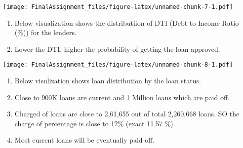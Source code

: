 \documentclass[]{article}
\newenvironment{Shaded}{\begin{snugshade}}{\end{snugshade}}
\newcommand{\DataTypeTok}[1]{\textcolor[rgb]{0.13,0.29,0.53}{#1}}
\newcommand{\DecValTok}[1]{\textcolor[rgb]{0.00,0.00,0.81}{#1}}
\newcommand{\FloatTok}[1]{\textcolor[rgb]{0.00,0.00,0.81}{#1}}
\newcommand{\KeywordTok}[1]{\textcolor[rgb]{0.13,0.29,0.53}{\textbf{#1}}}
\newcommand{\NormalTok}[1]{#1}
\newcommand{\OperatorTok}[1]{\textcolor[rgb]{0.81,0.36,0.00}{\textbf{#1}}}
\newcommand{\StringTok}[1]{\textcolor[rgb]{0.31,0.60,0.02}{#1}}
\providecommand{\tightlist}{%
  \setlength{\itemsep}{0pt}\setlength{\parskip}{0pt}}
\begin{document}
\texttt{[image: FinalAssignment\_files/figure-latex/unnamed-chunk-7-1.pdf]}

\begin{enumerate}
\def\labelenumi{\arabic{enumi}.}
\tightlist
\item
  Below visualization shows the distributiion of DTI (Debt to Income
  Ratio (\%)) for the lenders.
\item
  Lower the DTI, higher the probability of getting the loan approved.
\end{enumerate}

\begin{Shaded}
\end{Shaded}

\texttt{[image: FinalAssignment\_files/figure-latex/unnamed-chunk-8-1.pdf]}

\begin{enumerate}
\def\labelenumi{\arabic{enumi}.}
\tightlist
\item
  Below visulization shows loan distribution by the loan status.
\item
  Close to 900K loans are current and 1 Million loans which are paid
  off.
\item
  Charged of loans are close to 2,61,655 out of total 2,260,668 loans.
  SO the charge of percentage is close to 12\% (exact 11.57 \%).
\item
  Most current loans will be eventually paid off.
\end{enumerate}
\end{document}
